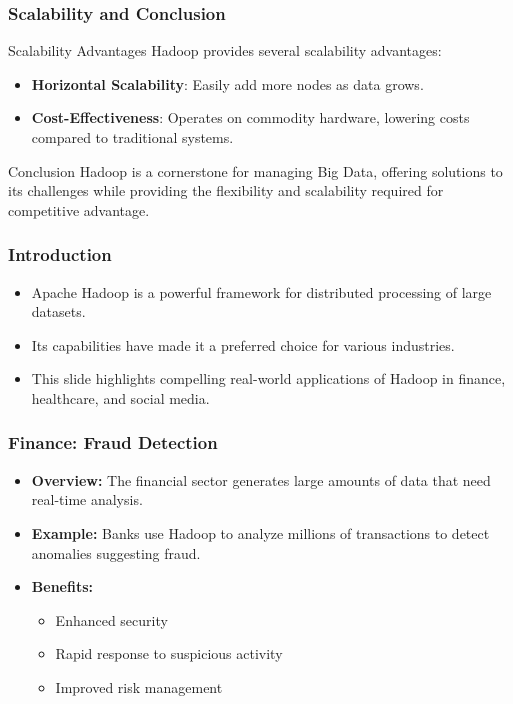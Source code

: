 \documentclass[aspectratio=169]{beamer}
\begin{document}
\begin{frame}[fragile]
    \frametitle{Scalability and Conclusion}
    \begin{block}{Scalability Advantages}
        Hadoop provides several scalability advantages:
        \begin{itemize}
            \item \textbf{Horizontal Scalability}: Easily add more nodes as data grows.
            \item \textbf{Cost-Effectiveness}: Operates on commodity hardware, lowering costs compared to traditional systems.
        \end{itemize}
    \end{block}
    
    \begin{block}{Conclusion}
        Hadoop is a cornerstone for managing Big Data, offering solutions to its challenges while providing the flexibility and scalability required for competitive advantage.
    \end{block}
\end{frame}

\begin{frame}[fragile]
    \frametitle{Introduction}
    \begin{itemize}
        \item Apache Hadoop is a powerful framework for distributed processing of large datasets.
        \item Its capabilities have made it a preferred choice for various industries.
        \item This slide highlights compelling real-world applications of Hadoop in finance, healthcare, and social media.
    \end{itemize}
\end{frame}

\begin{frame}[fragile]
    \frametitle{Finance: Fraud Detection}
    \begin{itemize}
        \item \textbf{Overview:} The financial sector generates large amounts of data that need real-time analysis.
        \item \textbf{Example:} Banks use Hadoop to analyze millions of transactions to detect anomalies suggesting fraud.
        \item \textbf{Benefits:}
        \begin{itemize}
            \item Enhanced security
            \item Rapid response to suspicious activity
            \item Improved risk management
        \end{itemize}
    \end{itemize}
\end{frame}
\end{document}
